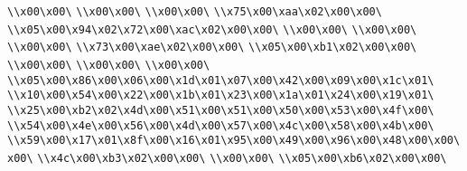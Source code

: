 \verb|\\x00\x00\|\newline
\verb|\\x00\x00\|\newline
\verb|\\x00\x00\|\newline
\verb|\\x75\x00\xaa\x02\x00\x00\|\newline
\verb|\\x05\x00\x94\x02\x72\x00\xac\x02\x00\x00\|\newline
\verb|\\x00\x00\|\newline
\verb|\\x00\x00\|\newline
\verb|\\x00\x00\|\newline
\verb|\\x73\x00\xae\x02\x00\x00\|\newline
\verb|\\x05\x00\xb1\x02\x00\x00\|\newline
\verb|\\x00\x00\|\newline
\verb|\\x00\x00\|\newline
\verb|\\x00\x00\|\newline
\verb|\\x05\x00\x86\x00\x06\x00\x1d\x01\x07\x00\x42\x00\x09\x00\x1c\x01\|\newline
\verb|\\x10\x00\x54\x00\x22\x00\x1b\x01\x23\x00\x1a\x01\x24\x00\x19\x01\|\newline
\verb|\\x25\x00\xb2\x02\x4d\x00\x51\x00\x51\x00\x50\x00\x53\x00\x4f\x00\|\newline
\verb|\\x54\x00\x4e\x00\x56\x00\x4d\x00\x57\x00\x4c\x00\x58\x00\x4b\x00\|\newline
\verb|\\x59\x00\x17\x01\x8f\x00\x16\x01\x95\x00\x49\x00\x96\x00\x48\x00\x00\x00\|\newline
\verb|\\x4c\x00\xb3\x02\x00\x00\|\newline
\verb|\\x00\x00\|\newline
\verb|\\x05\x00\xb6\x02\x00\x00\|\newline
